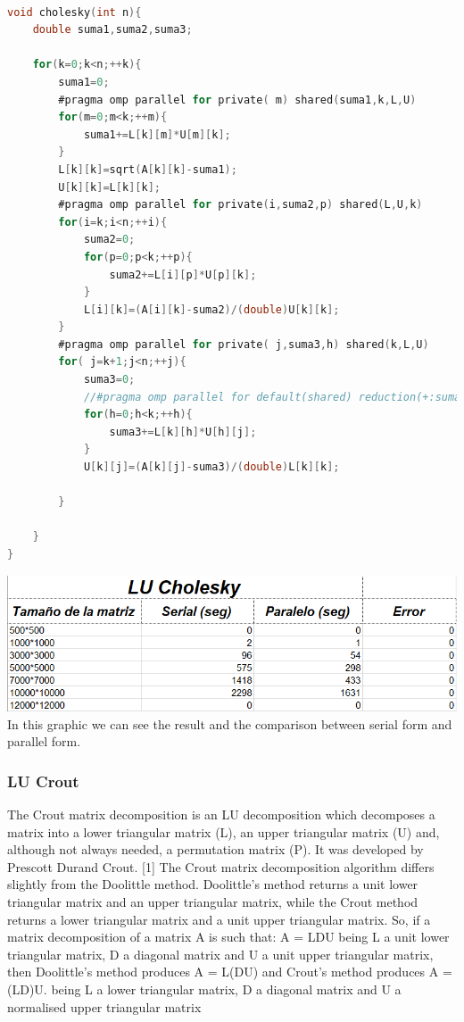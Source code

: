\documentclass{article}
\newcounter{subsubsubsection}[subsubsection]
\begin{document}

\begin{lstlisting}[language=C]

void cholesky(int n){
    double suma1,suma2,suma3;
    
    for(k=0;k<n;++k){
        suma1=0;
        #pragma omp parallel for private( m) shared(suma1,k,L,U)
        for(m=0;m<k;++m){
            suma1+=L[k][m]*U[m][k];
        }
        L[k][k]=sqrt(A[k][k]-suma1);
        U[k][k]=L[k][k];
        #pragma omp parallel for private(i,suma2,p) shared(L,U,k)
        for(i=k;i<n;++i){
            suma2=0;
            for(p=0;p<k;++p){
                suma2+=L[i][p]*U[p][k];
            }
            L[i][k]=(A[i][k]-suma2)/(double)U[k][k];
        }
        #pragma omp parallel for private( j,suma3,h) shared(k,L,U)
        for( j=k+1;j<n;++j){
            suma3=0;
            //#pragma omp parallel for default(shared) reduction(+:suma3)
            for(h=0;h<k;++h){
                suma3+=L[k][h]*U[h][j];
            }
            U[k][j]=(A[k][j]-suma3)/(double)L[k][k];
         
        }

    }
}

\end{lstlisting}



\includegraphics[width=\linewidth]{./images/cholesky.PNG}\\
In this graphic we can see the result and the comparison between serial form and parallel form.

\newpage

\subsubsection{LU Crout}


The Crout matrix decomposition is an LU decomposition which decomposes a matrix into a lower triangular matrix (L), an upper triangular matrix (U) and, although not always needed, a permutation matrix (P). It was developed by Prescott Durand Crout. [1]
The Crout matrix decomposition algorithm differs slightly from the Doolittle method. Doolittle's method returns a unit lower triangular matrix and an upper triangular matrix, while the Crout method returns a lower triangular matrix and a unit upper triangular matrix.
So, if a matrix decomposition of a matrix A is such that:
A = LDU
being L a unit lower triangular matrix, D a diagonal matrix and U a unit upper triangular matrix, then Doolittle's method produces
A = L(DU)
and Crout's method produces
A = (LD)U.
being L a lower triangular matrix, D a diagonal matrix and U a normalised upper triangular matrix
\end{document}
